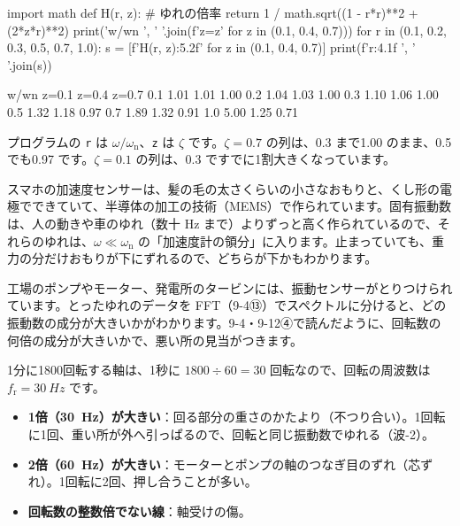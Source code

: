 \begin{phcode}[Python]
import math
def H(r, z):                       \# ゆれの倍率
    return 1 / math.sqrt((1 - r*r)**2 + (2*z*r)**2)
print('w/wn ', '  '.join(f'z={z}' for z in (0.1, 0.4, 0.7)))
for r in (0.1, 0.2, 0.3, 0.5, 0.7, 1.0):
    s = [f'{H(r, z):5.2f}' for z in (0.1, 0.4, 0.7)]
    print(f'{r:4.1f} ', '  '.join(s))
\end{phcode}
\begin{phcodeout}
w/wn  z=0.1  z=0.4  z=0.7
 0.1   1.01   1.01   1.00
 0.2   1.04   1.03   1.00
 0.3   1.10   1.06   1.00
 0.5   1.32   1.18   0.97
 0.7   1.89   1.32   0.91
 1.0   5.00   1.25   0.71
\end{phcodeout}
プログラムの \texttt{r} は $\omega/\omega_{\mathrm n}$、\texttt{z} は $\zeta$ です。$\zeta=0.7$ の列は、0.3 まで1.00 のまま、0.5 でも0.97 です。$\zeta=0.1$ の列は、0.3 ですでに1割大きくなっています。

\begin{phmijika}[スマホの中の加速度センサー]
スマホの加速度センサーは、髪の毛の太さくらいの小さなおもりと、くし形の電極でできていて、半導体の加工の技術（MEMS）で作られています。固有振動数は、人の動きや車のゆれ（数十 Hz まで）よりずっと高く作られているので、それらのゆれは、$\omega\ll\omega_{\mathrm n}$ の「加速度計の領分」に入ります。止まっていても、重力の分だけおもりが下にずれるので、どちらが下かもわかります。
\end{phmijika}


\leavevmode\label{ph:波-10:sec8}工場のポンプやモーター、発電所のタービンには、振動センサーがとりつけられています。とったゆれのデータを FFT（9-4⑬）でスペクトルに分けると、どの振動数の成分が大きいかがわかります。9-4・9-12④で読んだように、回転数の何倍の成分が大きいかで、悪い所の見当がつきます。

1分に\num{1800}回転する軸は、1秒に $1800\div60=30$ 回転なので、回転の周波数は $f_{\mathrm r}=\qty{30}{Hz}$ です。
\begin{itemize}[leftmargin=1.2\zw, itemsep=2pt, topsep=2pt, label={\color{bkTheme}●}]
\item \textbf{1倍（\qty{30}{Hz}）が大きい}：回る部分の重さのかたより（不つり合い）。1回転に1回、重い所が外へ引っぱるので、回転と同じ振動数でゆれる（波-2）。
\item \textbf{2倍（\qty{60}{Hz}）が大きい}：モーターとポンプの軸のつなぎ目のずれ（芯ずれ）。1回転に2回、押し合うことが多い。
\item \textbf{回転数の整数倍でない線}：軸受けの傷。
\end{itemize}

